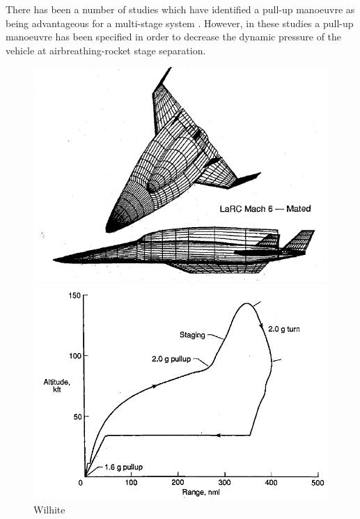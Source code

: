 There has been a number of studies which have identified a pull-up manoeuvre as being advantageous for a multi-stage system \cite{Tsuchiya2005,Wilhite1991,Mehta2001}. However, in these studies a pull-up manoeuvre has been specified in order to decrease the dynamic pressure of the vehicle at airbreathing-rocket stage separation. 
\begin{figure}
\centering
\begin{minipage}[b]{0.45\textwidth}
	\centering
	\includegraphics[width=\linewidth]{"figures/2_literature-review/Wilhite Booster Vehicle"}
	\caption{}
	\label{fig:WilhiteBoosterVehicle}
\end{minipage}	
\begin{minipage}[b]{0.45\textwidth}
\includegraphics[width=\linewidth]{"figures/2_literature-review/WilHite Booster Trajectory"}
\caption{Wilhite}
\label{fig:WilHiteBoosterTrajectory}
\end{minipage}
\end{figure}

